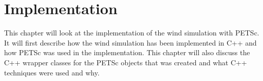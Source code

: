 \chapter{Implementation}

This chapter will look at the implementation of the wind simulation with PETSc.
It will first describe how the wind simulation has been implemented in C++ and
how PETSc was used in the implementation. This chapter will also discuss the
C++ wrapper classes for the PETSc objects that was created and what C++
techniques were used and why.






